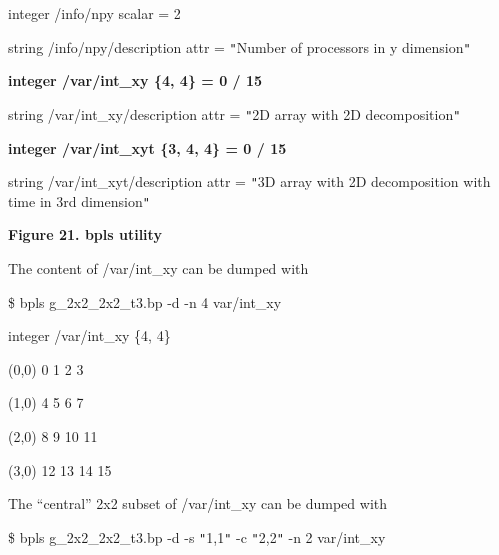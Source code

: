 \vspace{10pt}
integer    /info/npy                 scalar = 2 

\vspace{10pt}
string     /info/npy/description     attr   = \texttt{"}Number of processors in 
y dimension\texttt{"}

\vspace{10pt}
\textbf{integer    /var/int\_xy               \{4, 4\} = 0 / 15 }

\vspace{10pt}
string     /var/int\_xy/description   attr   = \texttt{"}2D array with 2D decomposition\texttt{"}

\vspace{10pt}
\textbf{integer    /var/int\_xyt              \{3, 4, 4\} = 0 / 15 }

\vspace{10pt}
string     /var/int\_xyt/description  attr   = \texttt{"}3D array with 2D decomposition 
with time in 3rd dimension\texttt{"}

\label{HToc144350180}

\vspace{22pt}
\leftskip=18pt
\parindent=0pt
{\color{color20} \textbf{Figure 21. bpls utility}}

\vspace{10pt}
\leftskip=0pt
The content of /var/int\_xy can be dumped with

\vspace{10pt}
\$ bpls  g\_2x2\_2x2\_t3.bp -d -n 4 var/int\_xy

\vspace{10pt}
\parindent=7pt
integer    /var/int\_xy    \{4, 4\}

\vspace{10pt}
\parindent=14pt
(0,0)    0 1 2 3 

\vspace{10pt}
(1,0)    4 5 6 7 

\vspace{10pt}
(2,0)    8 9 10 11 

\vspace{10pt}
(3,0)    12 13 14 15

\vspace{22pt}
\parindent=0pt
The ``central'' 2x2 subset of /var/int\_xy can be dumped with

\vspace{10pt}
\$ bpls g\_2x2\_2x2\_t3.bp -d -s \texttt{"}1,1\texttt{"} -c \texttt{"}2,2\texttt{"} 
-n 2 var/int\_xy

